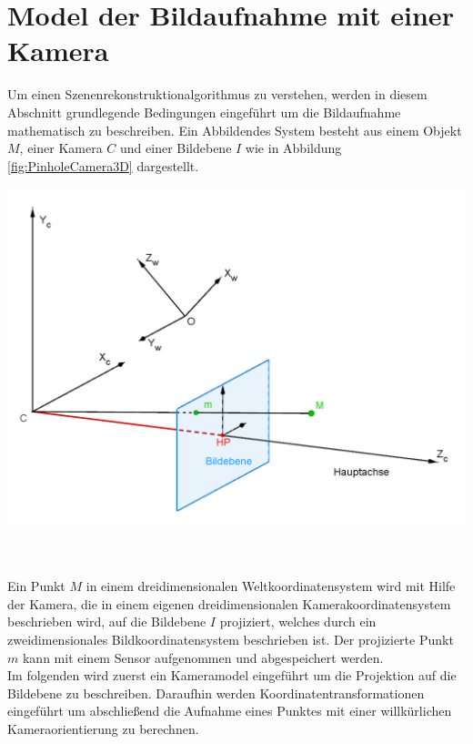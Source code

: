 \chapter{Model der Bildaufnahme mit einer Kamera }
\label{sec:CameraModels}

Um einen Szenenrekonstruktionalgorithmus zu verstehen, werden in diesem Abschnitt grundlegende  Bedingungen eingeführt um die Bildaufnahme mathematisch zu beschreiben. Ein Abbildendes System besteht aus einem Objekt $M$, einer Kamera $C$ und einer Bildebene $I$ wie in Abbildung \ref{fig:PinholeCamera3D} dargestellt.\\

\begin{minipage}{\linewidth}
	\centering
	\includegraphics[width=.8\linewidth]{images/PinholeCameraModell3D.png}
	\label{fig:PinholeCamera3D}
\end{minipage}\\\\

Ein Punkt $M$ in einem dreidimensionalen Weltkoordinatensystem wird mit Hilfe der Kamera, die in einem eigenen dreidimensionalen Kamerakoordinatensystem beschrieben wird, auf die Bildebene $I$ projiziert, welches durch ein zweidimensionales Bildkoordinatensystem beschrieben ist. Der projizierte Punkt $m$ kann mit einem Sensor aufgenommen und abgespeichert werden.  \\ 

Im folgenden wird zuerst ein Kameramodel eingeführt um die Projektion auf die Bildebene zu beschreiben. Daraufhin werden Koordinatentransformationen eingeführt um abschließend die Aufnahme eines Punktes mit einer willkürlichen Kameraorientierung zu berechnen. 


